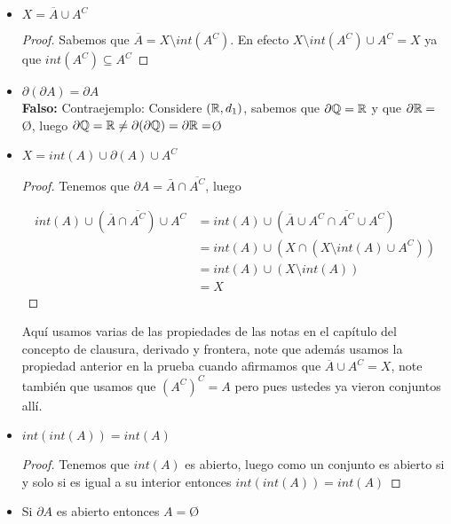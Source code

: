 \begin{itemize}[leftmargin=*]
\item $X=\overline{A}\cup A^{C}$\\

\begin{proof}
Sabemos que $\overline{A}=X\setminus int(A^C)$. En efecto $X\setminus int(A^C)\cup A^C=X$ ya que $int(A^C)\subseteq A^C$
\end{proof}
 
\item $\partial(\partial A)=\partial A$\\

\textbf{Falso:} Contraejemplo: Considere $(\mathbb{R},d_1)$, sabemos que $\partial \mathbb{Q}=\mathbb{R}$ y que $\partial \mathbb{R}= $\O, luego $\partial \mathbb{Q}=\mathbb{R}\neq\partial(\partial \mathbb{Q})=\partial \mathbb{R}=$\O

\item $X=int(A)\cup \partial(A) \cup A^C$\\

\begin{proof}
Tenemos que $\partial A=\bar{A} \cap \overline{A^C}$, luego

\begin{align*}
int(A)\cup (\overline{A}\cap \overline{A^C}) \cup A^C&=int(A)\cup (\overline{A}\cup A^C\cap \overline{A^C}\cup A^C)\\
&=int(A)\cup (X\cap (X\setminus int(A)\cup A^C))\\
&=int(A)\cup (X\setminus int(A))\\
&=X
\end{align*}
\end{proof}

\begin{note}
Aquí usamos varias de las propiedades de las notas en el capítulo del concepto de clausura, derivado y frontera, note que además usamos la propiedad anterior en la prueba cuando afirmamos que $\overline{A}\cup A^C=X$, note también que usamos que $(A^C)^C=A$ pero pues ustedes ya vieron conjuntos allí.
\end{note}

\item $int(int(A))=int(A)$\\

\begin{proof}
 Tenemos que $int(A)$ es abierto, luego como un conjunto es abierto si y solo si es igual a su interior entonces $int(int(A))=int(A)$
\end{proof}


\item Si $\partial A$ es abierto entonces $A=$\O\\


\end{itemize}
